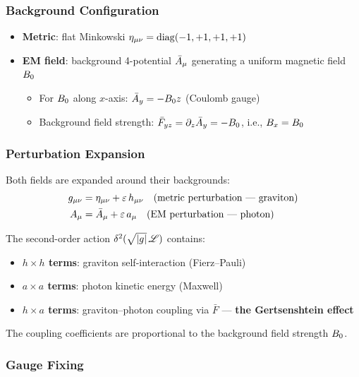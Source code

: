\subsubsection{Background Configuration}
\label{subsec:background-config}

\begin{itemize}
  \item \textbf{Metric}: flat Minkowski $\eta_{\mu\nu} = \mathrm{diag}(-1,+1,+1,+1)$
  \item \textbf{EM field}: background 4-potential $\bar{A}_\mu$ generating a uniform magnetic field $B_0$
    \begin{itemize}
      \item For $B_0$ along $x$-axis: $\bar{A}_y = -B_0 z$ (Coulomb gauge)
      \item Background field strength: $\bar{F}_{yz} = \partial_z \bar{A}_y = -B_0$, i.e., $B_x = B_0$
    \end{itemize}
\end{itemize}

\subsubsection{Perturbation Expansion}
\label{subsec:perturbation-expansion}

Both fields are expanded around their backgrounds:
\begin{align}
  g_{\mu\nu} &= \eta_{\mu\nu} + \varepsilon\, h_{\mu\nu} \quad\text{(metric perturbation --- graviton)} \\
  A_\mu      &= \bar{A}_\mu + \varepsilon\, a_\mu \quad\text{(EM perturbation --- photon)}
\end{align}

The second-order action $\delta^2(\sqrt{|g|}\, \mathscr{L})$ contains:
\begin{itemize}
  \item \textbf{$h \times h$ terms}: graviton self-interaction (Fierz--Pauli)
  \item \textbf{$a \times a$ terms}: photon kinetic energy (Maxwell)
  \item \textbf{$h \times a$ terms}: graviton--photon coupling via $\bar{F}$ --- \textbf{the Gertsenshtein effect}
\end{itemize}

The coupling coefficients are proportional to the background field strength $B_0$.

\subsubsection{Gauge Fixing}
\label{subsec:gauge-fixing}


